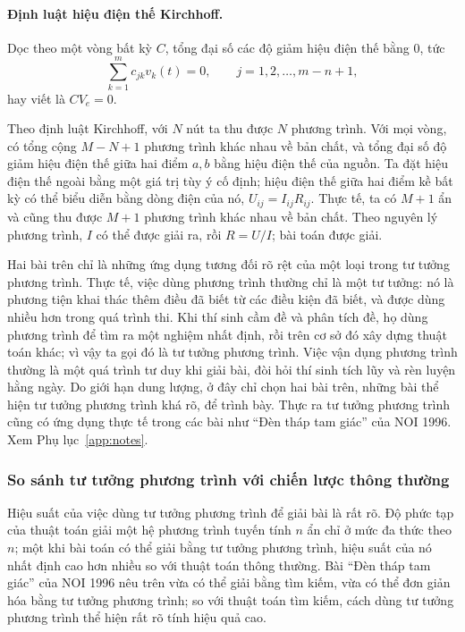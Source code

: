 \documentclass[11pt]{article}
\begin{document}
\paragraph{Định luật hiệu điện thế Kirchhoff.}
Dọc theo một vòng bất kỳ \(C\), tổng đại số các độ giảm hiệu điện thế bằng 0,
tức
\[
  \sum_{k=1}^{m} c_{jk}v_k(t)=0,\qquad j=1,2,\ldots,m-n+1,
\]
hay viết là \(CV_e=0\).

Theo định luật Kirchhoff, với \(N\) nút ta thu được \(N\) phương trình. Với
mọi vòng, có tổng cộng \(M-N+1\) phương trình khác nhau về bản chất, và tổng
đại số độ giảm hiệu điện thế giữa hai điểm \(a,b\) bằng hiệu điện thế của
nguồn. Ta đặt hiệu điện thế ngoài bằng một giá trị tùy ý cố định; hiệu điện
thế giữa hai điểm kề bất kỳ có thể biểu diễn bằng dòng điện của nó,
\(U_{ij}=I_{ij}R_{ij}\). Thực tế, ta có \(M+1\) ẩn và cũng thu được \(M+1\)
phương trình khác nhau về bản chất. Theo nguyên lý phương trình, \(I\) có thể
được giải ra, rồi \(R=U/I\); bài toán được giải.

Hai bài trên chỉ là những ứng dụng tương đối rõ rệt của một loại trong tư
tưởng phương trình. Thực tế, việc dùng phương trình thường chỉ là một tư
tưởng: nó là phương tiện khai thác thêm điều đã biết từ các điều kiện đã
biết, và được dùng nhiều hơn trong quá trình thi. Khi thí sinh cầm đề và
phân tích đề, họ dùng phương trình để tìm ra một nghiệm nhất định, rồi trên
cơ sở đó xây dựng thuật toán khác; vì vậy ta gọi đó là tư tưởng phương trình.
Việc vận dụng phương trình thường là một quá trình tư duy khi giải bài, đòi
hỏi thí sinh tích lũy và rèn luyện hằng ngày. Do giới hạn dung lượng, ở đây
chỉ chọn hai bài trên, những bài thể hiện tư tưởng phương trình khá rõ, để
trình bày. Thực ra tư tưởng phương trình cũng có ứng dụng thực tế trong các
bài như ``Đèn tháp tam giác'' của NOI 1996. Xem Phụ lục~\ref{app:notes}.

\subsubsection{So sánh tư tưởng phương trình với chiến lược thông thường}

Hiệu suất của việc dùng tư tưởng phương trình để giải bài là rất rõ. Độ phức
tạp của thuật toán giải một hệ phương trình tuyến tính \(n\) ẩn chỉ ở mức
đa thức theo \(n\); một khi bài toán có thể giải bằng tư tưởng phương trình,
hiệu suất của nó nhất định cao hơn nhiều so với thuật toán thông thường. Bài
``Đèn tháp tam giác'' của NOI 1996 nêu trên vừa có thể giải bằng tìm kiếm,
vừa có thể đơn giản hóa bằng tư tưởng phương trình; so với thuật toán tìm
kiếm, cách dùng tư tưởng phương trình thể hiện rất rõ tính hiệu quả cao.
\end{document}

